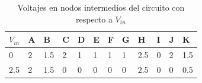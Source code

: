 \documentclass[letterpaper, 12pt]{article}
\numberwithin{equation}{section}
\begin{document}
\begin{table}[H]
  \centering
    \begin{tabular}{l|lllllllllll}
    \toprule
    \(V_{in}\) & A & B   & C & D & E & F & G & H   & I & J & K   \\
    \midrule
    0          & 2 & 1.5 & 2 & 1 & 1 & 1 & 1 & 2.5 & 0 & 2 & 1.5 \\
    2.5        & 2 & 1.5 & 0 & 0 & 0 & 0 & 0 & 2.5 & 0 & 0 & 0.5\\
    \bottomrule
    \end{tabular}
    \caption{Voltajes en nodos intermedios del circuito con respecto a \(V_{in}\)}
\end{table}
\end{document}
